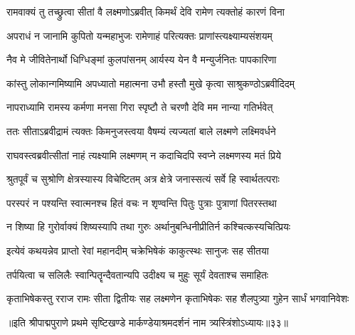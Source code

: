 \twolineshloka
{रामवाक्यं तु तच्छ्रुत्वा सीतां वै लक्ष्मणोऽब्रवीत्}
{किमर्थं देवि रामेण त्यक्तोहं कारणं विना} %

\twolineshloka
{अपराधं न जानामि कुपितो यन्महाभुजः}
{रामेणाहं परित्यक्तः प्राणांस्त्यक्ष्याम्यसंशयम्} %

\twolineshloka
{नैव मे जीवितेनार्थो धिग्धिङ्मां कुलपांसनम्}
{आर्यस्य येन वै मन्युर्जनितः पापकारिणा} %

\twolineshloka
{कांस्तु लोकान्गमिष्यामि अपध्यातो महात्मना}
{उभौ हस्तौ मुखे कृत्वा साश्रुकण्ठोऽब्रवीदिदम्} %

\twolineshloka
{नापराध्यामि रामस्य कर्मणा मनसा गिरा}
{स्पृष्टौ ते चरणौ देवि मम नान्या गतिर्भवेत्} %

\twolineshloka
{ततः सीताऽब्रवीद्रामं त्यक्तः किमनुजस्त्वया}
{वैषम्यं त्यज्यतां बाले लक्ष्मणे लक्ष्मिवर्धने} %

\twolineshloka
{राघवस्त्वब्रवीत्सीतां नाहं त्यक्ष्यामि लक्ष्मणम्}
{न कदाचिदपि स्वप्ने लक्ष्मणस्य मतं प्रिये} %

\twolineshloka
{श्रुतपूर्वं च सुश्रोणि क्षेत्रस्यास्य विचेष्टितम्}
{अत्र क्षेत्रे जनास्सत्यं सर्वे हि स्वार्थतत्पराः} %

\twolineshloka
{परस्परं न पश्यन्ति स्वात्मनश्च हितं वचः}
{न शृण्वन्ति पितुः पुत्राः पुत्राणां पितरस्तथा} %

\twolineshloka
{न शिष्या हि गुरोर्वाक्यं शिष्यस्यापि तथा गुरुः}
{अर्थानुबन्धिनीप्रीतिर्न कश्चित्कस्यचित्प्रियः} %

\twolineshloka
{इत्येवं कथयन्नेव प्राप्तो रेवां महानदीम्}
{चक्रेभिषेकं काकुत्स्थः सानुजः सह सीतया} %

\twolineshloka
{तर्पयित्वा च सलिलैः स्वान्पितॄन्दैवतान्यपि}
{उदीक्ष्य च मुहुः सूर्यं देवताश्च समाहितः} %

\twolineshloka
{कृताभिषेकस्तु रराज रामः सीता द्वितीयः सह लक्ष्मणेन}
{कृताभिषेकः सह शैलपुत्र्या गुहेन सार्धं भगवानिवेशः} %

॥इति श्रीपाद्मपुराणे प्रथमे सृष्टिखण्डे मार्कण्डेयाश्रमदर्शनं नाम त्र्यस्त्रिंशोऽध्यायः॥३३॥